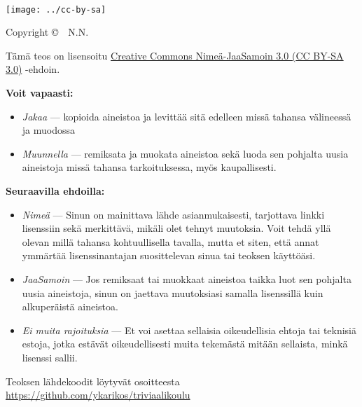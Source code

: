 \newpage
~\vfill
\thispagestyle{empty}
\setlength{\parindent}{0pt}
\setlength{\parskip}{\baselineskip}

\texttt{[image: ../cc-by-sa]}

Copyright \copyright\ \the\year\ N.N.

Tämä teos on lisensoitu \href{https://creativecommons.org/licenses/by-sa/3.0/deed.fi}{Creative Commons Nimeä-JaaSamoin 3.0 (\textsc{CC BY-SA 3.0})} -ehdoin.

\textbf{Voit vapaasti:}
\begin{itemize}
	\item \emph{Jakaa} — kopioida aineistoa ja levittää sitä edelleen missä tahansa välineessä ja muodossa
	\item \emph{Muunnella} — remiksata ja muokata aineistoa sekä luoda sen pohjalta uusia aineistoja missä tahansa tarkoituksessa, myös kaupallisesti.
\end{itemize}

\textbf{Seuraavilla ehdoilla:}
\begin{itemize}

	\item \emph{Nimeä} — Sinun on mainittava lähde asianmukaisesti, tarjottava linkki lisenssiin sekä merkittävä, mikäli olet tehnyt muutoksia. Voit tehdä yllä olevan millä tahansa kohtuullisella tavalla, mutta et siten, että annat ymmärtää lisenssinantajan suosittelevan sinua tai teoksen käyttöäsi.

	\item \emph{JaaSamoin} — Jos remiksaat tai muokkaat aineistoa taikka luot sen pohjalta uusia aineistoja, sinun on jaettava muutoksiasi samalla lisenssillä kuin alkuperäistä aineistoa.

	\item \emph{Ei muita rajoituksia} — Et voi asettaa sellaisia oikeudellisia ehtoja tai teknisiä estoja, jotka estävät oikeudellisesti muita tekemästä mitään sellaista, minkä lisenssi sallii.
\end{itemize}

Teoksen lähdekoodit löytyvät osoitteesta \url{https://github.com/ykarikos/triviaalikoulu}



